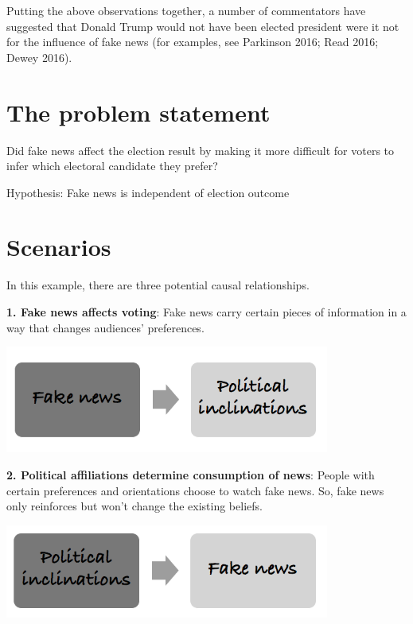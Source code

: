\documentclass[openany]{book}
\begin{document}
Putting the above observations together, a number of commentators have suggested that Donald Trump would not have been elected president were it not for the influence of fake news (for examples, see Parkinson 2016; Read 2016; Dewey 2016).

\hypertarget{the-problem-statement}{%
\section{The problem statement}\label{the-problem-statement}}

Did fake news affect the election result by making it more difficult for voters to infer which electoral
candidate they prefer?

Hypothesis: Fake news is independent of election outcome

\hypertarget{scenarios}{%
\section{Scenarios}\label{scenarios}}

In this example, there are three potential causal relationships.

\textbf{1. Fake news affects voting}: Fake news carry certain pieces of information in a way that changes audiences' preferences.

\includegraphics[width=0.8\textwidth,height=\textheight]{fig/scenario1.png}

\textbf{2. Political affiliations determine consumption of news}: People with certain preferences and orientations choose to watch fake news. So, fake news only reinforces but won't change the existing beliefs.

\includegraphics[width=0.8\textwidth,height=\textheight]{fig/scenario2.png}
\end{document}
